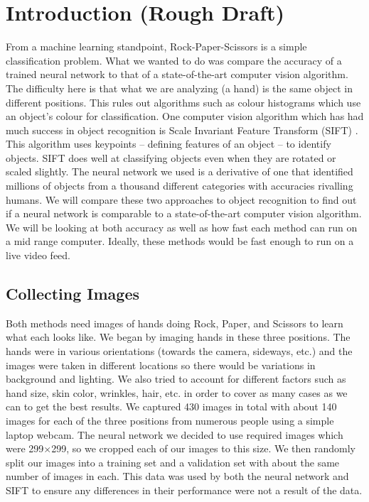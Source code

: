\section{Introduction (Rough Draft)}

From a machine learning standpoint, Rock-Paper-Scissors is a simple classification problem. What we wanted to do was compare the accuracy of a trained neural network to that of a state-of-the-art computer vision algorithm. The difficulty here is that what we are analyzing (a hand) is the same object in different positions. This rules out algorithms such as colour histograms which use an object's colour for classification. One computer vision algorithm which has had much success in object recognition is Scale Invariant Feature Transform (SIFT) \cite{SIFT}. This algorithm uses keypoints -- defining features of an object -- to identify objects. SIFT does well at classifying objects even when they are rotated or scaled slightly. The neural network we used is a derivative of one that identified millions of objects from a thousand different categories with accuracies rivalling humans. We will compare these two approaches to object recognition to find out if a neural network is comparable to a state-of-the-art computer vision algorithm. We will be looking at both accuracy as well as how fast each method can run on a mid range computer. Ideally, these methods would be fast enough to run on a live video feed.

\subsection{Collecting Images}
Both methods need images of hands doing Rock, Paper, and Scissors to learn what each looks like. We began by imaging hands in these three positions. The hands were in various orientations (towards the camera, sideways, etc.) and the images were taken in different locations so there would be variations in background and lighting.  We also tried to account for different factors such as hand size, skin color, wrinkles, hair, etc. in order to cover as many cases as we can to get the best results. We captured 430 images in total with about 140 images for each of the three positions from numerous people using a simple laptop webcam. The neural network we decided to use required images which were 299$\times$299, so we cropped each of our images to this size. We then randomly split our images into a training set and a validation set with about the same number of images in each. This data was used by both the neural network and SIFT to ensure any differences in their performance were not a result of the data.

